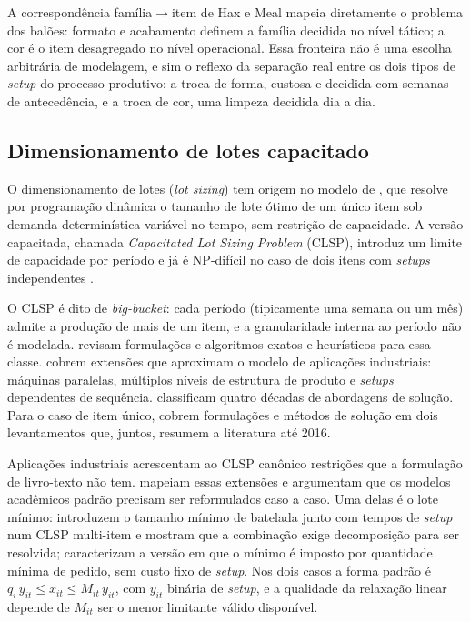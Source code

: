 \documentclass[fleqn,12pt,a4paper]{article}
\begin{document}
A correspondência família$\to$item de Hax e Meal mapeia diretamente o problema dos balões: formato e acabamento definem a família decidida no nível tático; a cor é o item desagregado no nível operacional. Essa fronteira não é uma escolha arbitrária de modelagem, e sim o reflexo da separação real entre os dois tipos de \textit{setup} do processo produtivo: a troca de forma, custosa e decidida com semanas de antecedência, e a troca de cor, uma limpeza decidida dia a dia.

\subsection{Dimensionamento de lotes capacitado}

O dimensionamento de lotes (\textit{lot sizing}) tem origem no modelo de , que resolve por programação dinâmica o tamanho de lote ótimo de um único item sob demanda determinística variável no tempo, sem restrição de capacidade. A versão capacitada, chamada \textit{Capacitated Lot Sizing Problem} (CLSP), introduz um limite de capacidade por período e já é NP-difícil no caso de dois itens com \textit{setups} independentes \cite{bitranyanasse1982,chenthizy1990}.

O CLSP é dito de \textit{big-bucket}: cada período (tipicamente uma semana ou um mês) admite a produção de mais de um item, e a granularidade interna ao período não é modelada.  revisam formulações e algoritmos exatos e heurísticos para essa classe.  cobrem extensões que aproximam o modelo de aplicações industriais: máquinas paralelas, múltiplos níveis de estrutura de produto e \textit{setups} dependentes de sequência.  classificam quatro décadas de abordagens de solução. Para o caso de item único,  cobrem formulações e métodos de solução em dois levantamentos que, juntos, resumem a literatura até 2016.

Aplicações industriais acrescentam ao CLSP canônico restrições que a formulação de livro-texto não tem.  mapeiam essas extensões e argumentam que os modelos acadêmicos padrão precisam ser reformulados caso a caso. Uma delas é o lote mínimo:  introduzem o tamanho mínimo de batelada junto com tempos de \textit{setup} num CLSP multi-item e mostram que a combinação exige decomposição para ser resolvida;  caracterizam a versão em que o mínimo é imposto por quantidade mínima de pedido, sem custo fixo de \textit{setup}. Nos dois casos a forma padrão é $q_i\,y_{it} \le x_{it} \le M_{it}\,y_{it}$, com $y_{it}$ binária de \textit{setup}, e a qualidade da relaxação linear depende de $M_{it}$ ser o menor limitante válido disponível.
\end{document}
